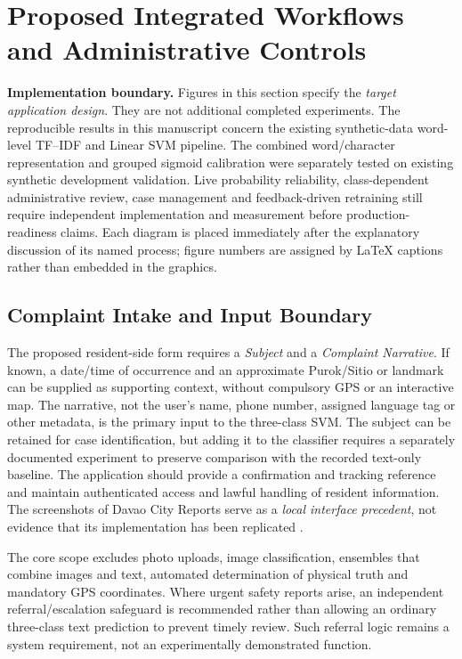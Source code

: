 \section{Proposed Integrated Workflows and Administrative Controls}
\label{sec:proposed-operational-workflows}
\textbf{Implementation boundary.} Figures in this section specify the \emph{target application design}. They are not additional completed experiments. The reproducible results in this manuscript concern the existing synthetic-data word-level TF--IDF and Linear SVM pipeline. The combined word/character representation and grouped sigmoid calibration were separately tested on existing synthetic development validation. Live probability reliability, class-dependent administrative review, case management and feedback-driven retraining still require independent implementation and measurement before production-readiness claims. Each diagram is placed immediately after the explanatory discussion of its named process; figure numbers are assigned by LaTeX captions rather than embedded in the graphics.

\subsection{Complaint Intake and Input Boundary}
The proposed resident-side form requires a \emph{Subject} and a \emph{Complaint Narrative}. If known, a date/time of occurrence and an approximate Purok/Sitio or landmark can be supplied as supporting context, without compulsory GPS or an interactive map. The narrative, not the user's name, phone number, assigned language tag or other metadata, is the primary input to the three-class SVM. The subject can be retained for case identification, but adding it to the classifier requires a separately documented experiment to preserve comparison with the recorded text-only baseline. The application should provide a confirmation and tracking reference and maintain authenticated access and lawful handling of resident information. The screenshots of Davao City Reports serve as a \emph{local interface precedent}, not evidence that its implementation has been replicated \cite{dcr,ra10173}.

The core scope excludes photo uploads, image classification, ensembles that combine images and text, automated determination of physical truth and mandatory GPS coordinates. Where urgent safety reports arise, an independent referral/escalation safeguard is recommended rather than allowing an ordinary three-class text prediction to prevent timely review. Such referral logic remains a system requirement, not an experimentally demonstrated function.

